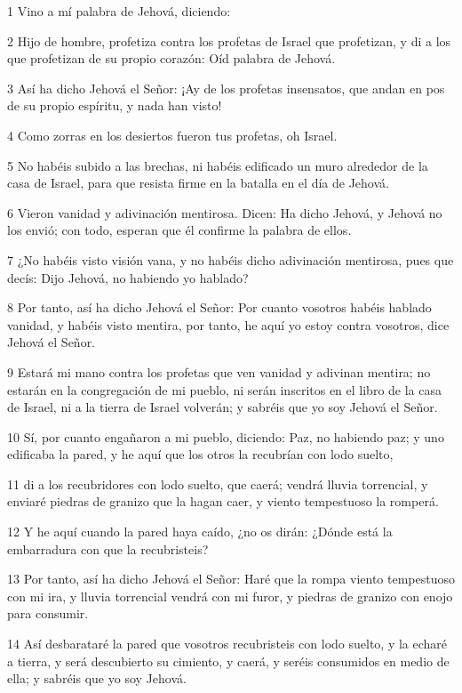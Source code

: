 \par 1 Vino a mí palabra de Jehová, diciendo:
\par 2 Hijo de hombre, profetiza contra los profetas de Israel que profetizan, y di a los que profetizan de su propio corazón: Oíd palabra de Jehová.
\par 3 Así ha dicho Jehová el Señor: ¡Ay de los profetas insensatos, que andan en pos de su propio espíritu, y nada han visto!
\par 4 Como zorras en los desiertos fueron tus profetas, oh Israel.
\par 5 No habéis subido a las brechas, ni habéis edificado un muro alrededor de la casa de Israel, para que resista firme en la batalla en el día de Jehová.
\par 6 Vieron vanidad y adivinación mentirosa. Dicen: Ha dicho Jehová, y Jehová no los envió; con todo, esperan que él confirme la palabra de ellos.
\par 7 ¿No habéis visto visión vana, y no habéis dicho adivinación mentirosa, pues que decís: Dijo Jehová, no habiendo yo hablado?
\par 8 Por tanto, así ha dicho Jehová el Señor: Por cuanto vosotros habéis hablado vanidad, y habéis visto mentira, por tanto, he aquí yo estoy contra vosotros, dice Jehová el Señor.
\par 9 Estará mi mano contra los profetas que ven vanidad y adivinan mentira; no estarán en la congregación de mi pueblo, ni serán inscritos en el libro de la casa de Israel, ni a la tierra de Israel volverán; y sabréis que yo soy Jehová el Señor.
\par 10 Sí, por cuanto engañaron a mi pueblo, diciendo: Paz, no habiendo paz; y uno edificaba la pared, y he aquí que los otros la recubrían con lodo suelto,
\par 11 di a los recubridores con lodo suelto, que caerá; vendrá lluvia torrencial, y enviaré piedras de granizo que la hagan caer, y viento tempestuoso la romperá.
\par 12 Y he aquí cuando la pared haya caído, ¿no os dirán: ¿Dónde está la embarradura con que la recubristeis?
\par 13 Por tanto, así ha dicho Jehová el Señor: Haré que la rompa viento tempestuoso con mi ira, y lluvia torrencial vendrá con mi furor, y piedras de granizo con enojo para consumir.
\par 14 Así desbarataré la pared que vosotros recubristeis con lodo suelto, y la echaré a tierra, y será descubierto su cimiento, y caerá, y seréis consumidos en medio de ella; y sabréis que yo soy Jehová.
